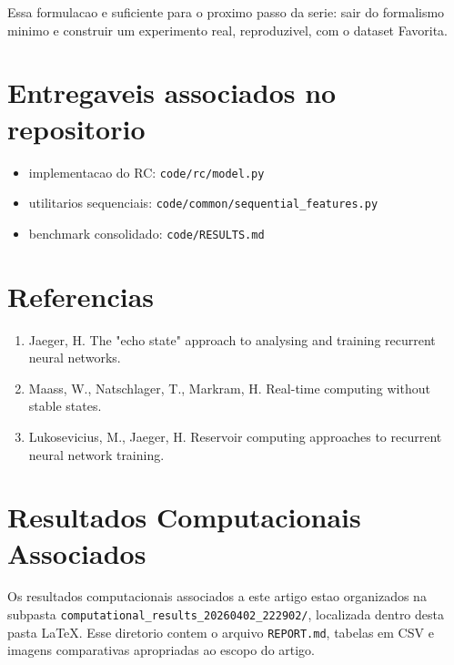 \documentclass[12pt]{article}
\providecommand{\tightlist}{%
  \setlength{\itemsep}{0pt}\setlength{\parskip}{0pt}}
\begin{document}
Essa formulacao e suficiente para o proximo passo da serie: sair do formalismo minimo e construir um experimento real, reproduzivel, com o dataset Favorita.

\section{Entregaveis associados no repositorio}\label{entregaveis-associados-no-repositorio}

\begin{itemize}
\tightlist
\item
  implementacao do RC: \texttt{code/rc/model.py}
\item
  utilitarios sequenciais: \texttt{code/common/sequential\_features.py}
\item
  benchmark consolidado: \texttt{code/RESULTS.md}
\end{itemize}

\section{Referencias}\label{referencias}

\begin{enumerate}
\def\labelenumi{\arabic{enumi}.}
\tightlist
\item
  Jaeger, H. The "echo state" approach to analysing and training recurrent neural networks.
\item
  Maass, W., Natschlager, T., Markram, H. Real-time computing without stable states.
\item
  Lukosevicius, M., Jaeger, H. Reservoir computing approaches to recurrent neural network training.
\end{enumerate}

\section*{Resultados Computacionais Associados}

Os resultados computacionais associados a este artigo estao organizados na subpasta \texttt{computational\_results\_20260402\_222902/}, localizada dentro desta pasta \LaTeX. Esse diretorio contem o arquivo \texttt{REPORT.md}, tabelas em CSV e imagens comparativas apropriadas ao escopo do artigo.
\end{document}
